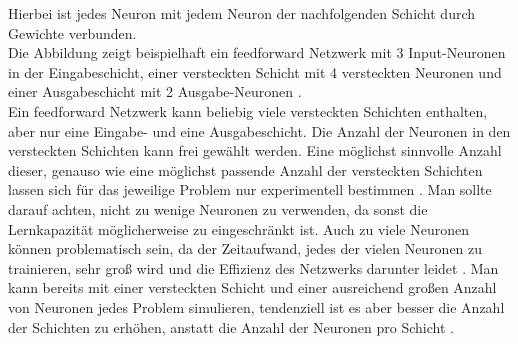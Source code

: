 Hierbei ist jedes Neuron mit jedem Neuron der nachfolgenden Schicht durch Gewichte verbunden.\\
Die Abbildung zeigt beispielhaft ein feedforward Netzwerk mit 3 Input-Neuronen in der Eingabeschicht, einer versteckten Schicht mit 4 versteckten Neuronen und einer Ausgabeschicht mit 2 Ausgabe-Neuronen \cite{Bishop1995}.\\
Ein feedforward Netzwerk kann beliebig viele versteckten Schichten enthalten, aber nur eine Eingabe- und eine Ausgabeschicht. Die Anzahl der Neuronen in den versteckten Schichten kann frei gew\"ahlt werden. Eine möglichst sinnvolle Anzahl dieser, genauso wie eine möglichst passende Anzahl der versteckten Schichten lassen sich für das jeweilige Problem nur experimentell bestimmen \cite{handson}. Man sollte darauf achten, nicht zu wenige Neuronen zu verwenden, da sonst die Lernkapazit\"at m\"oglicherweise zu eingeschr\"ankt ist. Auch zu viele Neuronen k\"onnen problematisch sein, da der Zeitaufwand, jedes der vielen Neuronen zu trainieren, sehr groß wird und die Effizienz des Netzwerks darunter leidet \cite{Rashid}. Man kann bereits mit einer versteckten Schicht und einer ausreichend gro\ss en Anzahl von Neuronen jedes Problem simulieren, tendenziell ist es aber besser die Anzahl der Schichten zu erh\"ohen, anstatt die Anzahl der Neuronen pro Schicht \cite{handson}. 



